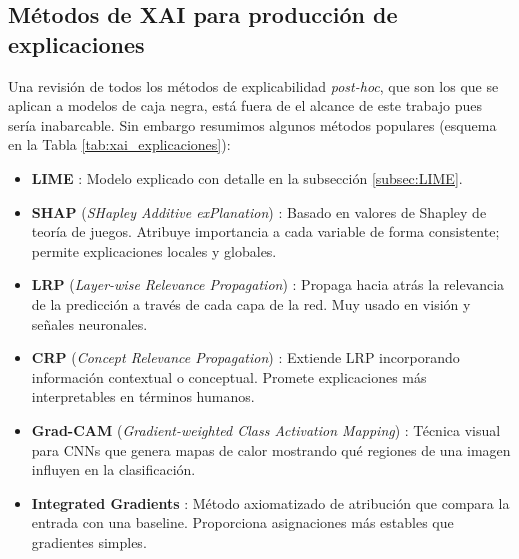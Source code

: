 \subsection*{Métodos de XAI para producción de explicaciones}

Una revisión de todos los métodos de explicabilidad \textit{post-hoc}, que son los que se aplican a modelos de caja negra, está fuera de el alcance de este trabajo pues sería inabarcable. Sin embargo resumimos algunos métodos populares (esquema en la Tabla \ref{tab:xai_explicaciones}):

\begin{itemize}
    \item \textbf{LIME} \cite{LIME}: Modelo explicado con detalle en la subsección \ref{subsec:LIME}.
    
    \item \textbf{SHAP} (\textit{SHapley Additive exPlanation}) \cite{SHAP}: Basado en valores de Shapley de teoría de juegos. Atribuye importancia a cada variable de forma consistente; permite explicaciones locales y globales. 
    
    \item \textbf{LRP} (\textit{Layer-wise Relevance Propagation}) \cite{LRP}: Propaga hacia atrás la relevancia de la predicción a través de cada capa de la red. Muy usado en visión y señales neuronales. 
    
    \item \textbf{CRP} (\textit{Concept Relevance Propagation}) \cite{CRP}: Extiende LRP incorporando información contextual o conceptual. Promete explicaciones más interpretables en términos humanos. 
    
    \item \textbf{Grad-CAM} (\textit{Gradient-weighted Class Activation Mapping}) \cite{Gradcam}: Técnica visual para CNNs que genera mapas de calor mostrando qué regiones de una imagen influyen en la clasificación. 

    \item \textbf{Integrated Gradients} \cite{IntGradients}: Método axiomatizado de atribución que compara la entrada con una baseline. Proporciona asignaciones más estables que gradientes simples. 
    

\end{itemize}


